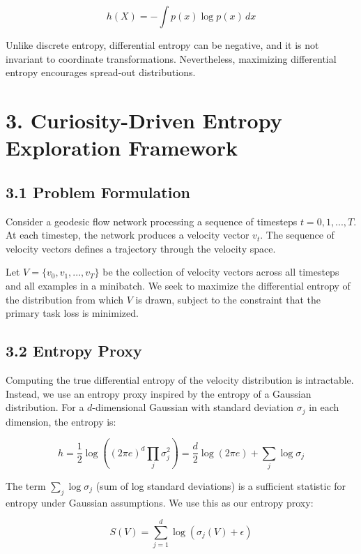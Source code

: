 \documentclass[12pt]{article}
\begin{document}
\begin{equation}
h(X) = -\int p(x) \log p(x) \, dx
\end{equation}

Unlike discrete entropy, differential entropy can be negative, and it is not invariant to coordinate transformations. Nevertheless, maximizing differential entropy encourages spread-out distributions.

\section{3. Curiosity-Driven Entropy Exploration Framework}

\subsection{3.1 Problem Formulation}

Consider a geodesic flow network processing a sequence of timesteps $t = 0, 1, ..., T$. At each timestep, the network produces a velocity vector $v_t$. The sequence of velocity vectors defines a trajectory through the velocity space.

Let $V = \{v_0, v_1, ..., v_T\}$ be the collection of velocity vectors across all timesteps and all examples in a minibatch. We seek to maximize the differential entropy of the distribution from which $V$ is drawn, subject to the constraint that the primary task loss is minimized.

\subsection{3.2 Entropy Proxy}

Computing the true differential entropy of the velocity distribution is intractable. Instead, we use an entropy proxy inspired by the entropy of a Gaussian distribution. For a $d$-dimensional Gaussian with standard deviation $\sigma_j$ in each dimension, the entropy is:

\begin{equation}
h = \frac{1}{2} \log((2\pi e)^d \prod_j \sigma_j^2) = \frac{d}{2} \log(2\pi e) + \sum_j \log \sigma_j
\end{equation}

The term $\sum_j \log \sigma_j$ (sum of log standard deviations) is a sufficient statistic for entropy under Gaussian assumptions. We use this as our entropy proxy:

\begin{equation}
S(V) = \sum_{j=1}^d \log(\sigma_j(V) + \epsilon)
\end{equation}
\end{document}
